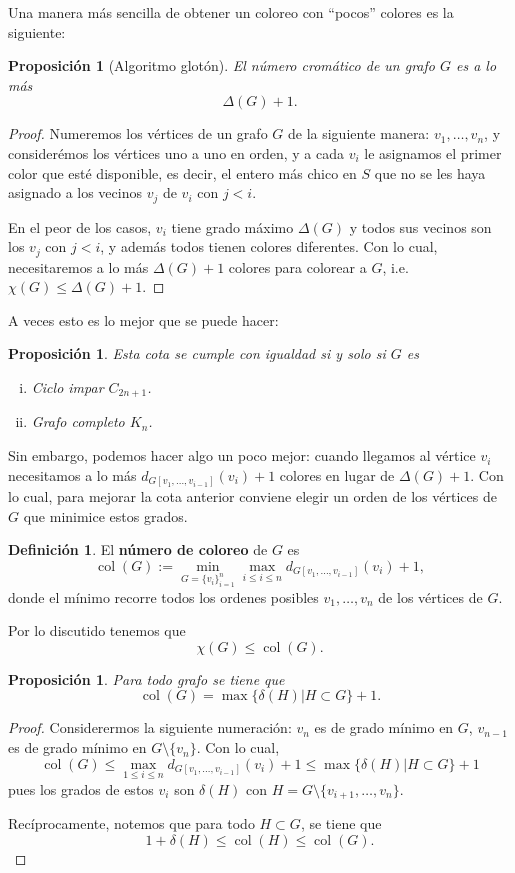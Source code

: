 \documentclass[12pt]{report}
\theoremstyle{plain}
\newtheorem{proposition}[theorem]{Proposición}
\theoremstyle{definition}
\newtheorem{definition}[theorem]{Definición}
\newcommand{\col}[1]{\operatorname{col} (#1)}
\begin{document}
Una manera más sencilla de obtener un coloreo con ``pocos'' colores es la siguiente:

\begin{proposition}[Algoritmo glotón]\label{prop:algoritmo gloton}
El número cromático de un grafo $G$ es a lo más
\[
    \Delta (G) + 1.
\]
\end{proposition}
\begin{proof}
Numeremos los vértices de un grafo $G$ de la siguiente manera: $v_1, \ldots, v_n$, y considerémos los vértices uno a uno en orden, y a cada $v_i$ le asignamos el primer color que esté disponible, es decir, el entero más chico en $S$ que no se les haya asignado a los vecinos $v_{j}$ de $v_i$ con $j < i$.

En el peor de los casos, $v_i$ tiene grado máximo $\Delta (G)$ y todos sus vecinos son los $v_j$ con $j < i$, y además todos tienen colores diferentes. Con lo cual, necesitaremos a lo más $\Delta (G) + 1$ colores para colorear a $G$, i.e. $\chi (G) \leq \Delta (G) + 1$.
\end{proof}


A veces esto es lo mejor que se puede hacer:
\begin{proposition}
Esta cota se cumple con igualdad si y solo si $G$ es
\begin{enumerate}[(i)]
\item Ciclo impar $C_{2n+1}$.
\item Grafo completo $K_n$.
\end{enumerate}
\end{proposition}

Sin embargo, podemos hacer algo un poco mejor: cuando llegamos al vértice $v_i$ necesitamos a lo más $d_{G[v_1,\ldots,v_{i-1}]}(v_i) + 1$ colores en lugar de $\Delta (G) + 1$. Con lo cual, para mejorar la cota anterior conviene elegir un orden de los vértices de $G$ que minimice estos grados.


\begin{definition}
El \textbf{número de coloreo} de $G$ es
\[
    \col G := \min_{G = \{v_i\}_{i = 1}^n} \max_{i \leq i \leq n} d_{G [v_1, \ldots, v_{i-1}]} (v_i) + 1 ,
\]
donde el mínimo recorre todos los ordenes posibles $v_1, \ldots, v_n$ de los vértices de $G.$
\end{definition}
Por lo discutido tenemos que
\[
    \boxed{\chi (G) \leq \col G .}
\]

\begin{proposition}
Para todo grafo se tiene que
\[
    \col G = \max \{ \delta (H) | H \subset G \} + 1.
\]
\end{proposition}
\begin{proof}
Considerermos la siguiente numeración: $v_n$ es de grado mínimo en $G$, $v_{n-1}$ es de grado mínimo en $G \setminus \{v_n\}$. Con lo cual,
\[
    \col G \leq \max_{1 \leq i \leq n} d_{G [ v_1, \ldots, v_{i-1}]} (v_i) + 1 \leq \max \{ \delta (H) | H \subset G \} + 1
\]
pues los grados de estos $v_i$ son $\delta (H)$ con $H = G \setminus \{v_{i+1}, \ldots, v_n\}$.

Recíprocamente, notemos que para todo $H \subset G$, se tiene que
\[
    1 + \delta (H) \leq \col H \leq \col  G .
\]
\end{proof}
\end{document}
